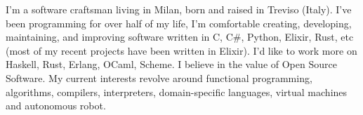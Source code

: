 \documentclass[9pt]{developercv}
\begin{document}
\begin{minipage}[t]{0.5\textwidth}
	\vspace{-\baselineskip}

	I'm a software craftsman living in Milan, born and raised in Treviso (Italy). I've been programming for over half of my life, I'm comfortable creating, developing, maintaining, and improving software written in C, C\#, Python, Elixir, Rust, etc (most of my recent projects have been written in Elixir). I'd like to work more on Haskell, Rust, Erlang, OCaml, Scheme. I believe in the value of Open Source Software. My current interests revolve around functional programming, algorithms, compilers, interpreters, domain-specific languages, virtual machines and autonomous robot.
\end{minipage}
\hfill
\begin{minipage}[t]{0.4\textwidth}
	\vspace{-\baselineskip}
	\begin{barchart}{5.5}
	\end{barchart}
\end{minipage}



\end{document}
